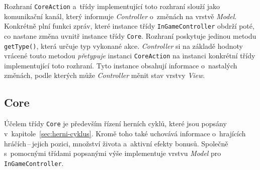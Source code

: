 Rozhraní \texttt{CoreAction} a~třídy implementující toto rozhraní slouží jako komunikační kanál, který informuje \emph{Controller} o~změnách na vrstvě \emph{Model}. Konkrétně plní funkci zpráv, které instance třídy \texttt{InGameController} obdrží poté, co nastane změna uvnitř instance třídy \texttt{Core}. Rozhraní poskytuje jedinou metodu \texttt{getType()}, která určuje typ vykonané akce. \emph{Controller} si na základě hodnoty vrácené touto metodou \emph{přetypuje} instanci \texttt{CoreAction} na instanci konkrétní třídy implementující toto rozhraní. Tyto instance obsahují informace o~nastalých změnách, podle kterých může \emph{Controller} měnit stav vrstvy \emph{View}.

\subsection*{Core}

Účelem třídy \texttt{Core} je především řízení herních cyklů, které jsou popsány v~kapitole~\ref{sec:herni-cyklus}. Kromě toho také uchovává informace o~hrajících hráčích\,--\,jejich pozici, množství života a~aktivní efekty bonusů. Společně s~pomocnými třídami popsanými výše implementuje vrstvu \emph{Model} pro \texttt{InGameController}.

